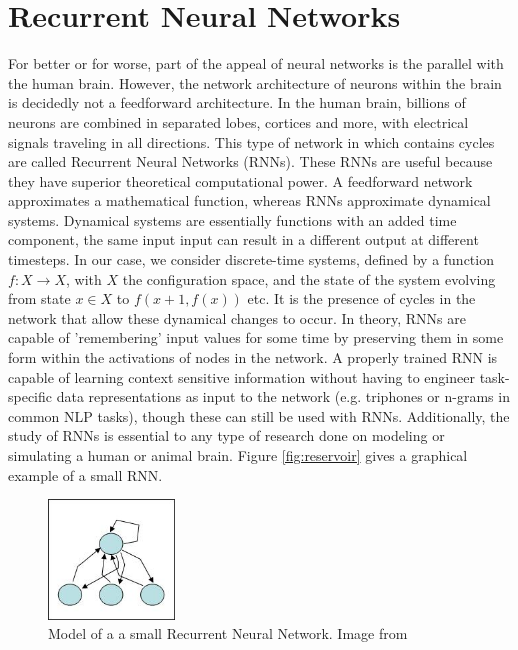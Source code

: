\documentclass[12pt,oneside]{CUNY_CS_PhD}
\begin{document}
\section{Recurrent Neural Networks}
For better or for worse, part of the appeal of neural networks is the parallel with the human brain. However, the network architecture of neurons within the brain is decidedly not a feedforward architecture. In the human brain, billions of neurons are combined in separated lobes, cortices and more, with electrical signals traveling in all directions. 
 This type of network in which contains cycles are called Recurrent Neural Networks (RNNs). 
 These RNNs are useful because they have superior theoretical computational power. A feedforward network approximates a mathematical function, whereas RNNs approximate dynamical systems. Dynamical systems are essentially functions with an added time component, the same input input can result in a different output at different timesteps.
 In our case, we consider discrete-time systems, defined by a function $f: X \rightarrow X$, with $X$ the configuration space, and the state of the system evolving from state $x \in X$ to $f(x+1, f(x))$ etc. 
It is the presence of cycles in the network that allow these dynamical changes to occur. In theory, RNNs are capable of
'remembering' input values for some time by preserving them in some form within the activations of nodes in the network. A properly trained RNN is capable of learning context sensitive information without having to engineer task-specific data representations as input to the network (e.g. triphones or n-grams in common NLP tasks), though these can still be used with RNNs. Additionally, the study of RNNs is essential to any type of research done on modeling or simulating a human or animal brain. Figure \ref{fig:reservoir} gives a graphical example of a small RNN.
\begin{figure}[h]
\centering
\includegraphics[width=0.3\textwidth]{pictures/rnn.png}
\caption{Model of a a small Recurrent Neural Network. Image from \cite{rnn} }
\label{fig:rnn}
\end{figure}
\end{document}
